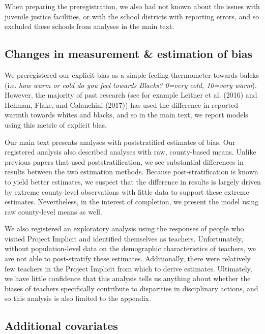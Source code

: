 \documentclass[]{article}
\theoremstyle{definition}
\theoremstyle{definition}
\theoremstyle{remark}
\begin{document}
When preparing the preregistration, we also had not known about the
issues with juvenile justice facilities, or with the school districts
with reporting errors, and so excluded these schools from analyses in
the main text.

\subsection{Changes in measurement \& estimation of
bias}\label{changes-in-measurement-estimation-of-bias}

We preregistered our explicit bias as a simple feeling thermometer
towards balcks (i.e. \emph{how warm or cold do you feel towards Blacks?
0=very cold, 10=very warm}). However, the majority of past research (see
for example Leitner et al. (2016) and Hehman, Flake, and Calanchini
(2017)) has used the difference in reported warmth towards whites and
blacks, and so in the main text, we report models using this metric of
explicit bias.

Our main text presents analyses with poststratified estimates of bias.
Our registered analysis also described analyses with raw, county-based
means. Unlike previous papers that used poststratification, we see
substantial differences in results between the two estimation methods.
Because post-stratification is known to yield better estimates, we
suspect that the difference in results is largely driven by extreme
county-level observations with little data to support these extreme
estimates. Nevertheless, in the interest of completion, we present the
model using raw county-level means as well.

We also registered an exploratory analysis using the responses of people
who visited Project Implicit and identified themselves as teachers.
Unfortunately, without population-level data on the demographic
characteristics of teachers, we are not able to post-stratify these
estimates. Additionally, there were relatively few teachers in the
Project Implicit from which to derive estimates. Ultimately, we have
little confidence that this analysis tells us anything about whether the
biases of teachers specifically contribute to disparities in
disciplinary actions, and so this analysis is also limited to the
appendix.

\subsection{Additional covariates}\label{additional-covariates}
\end{document}
